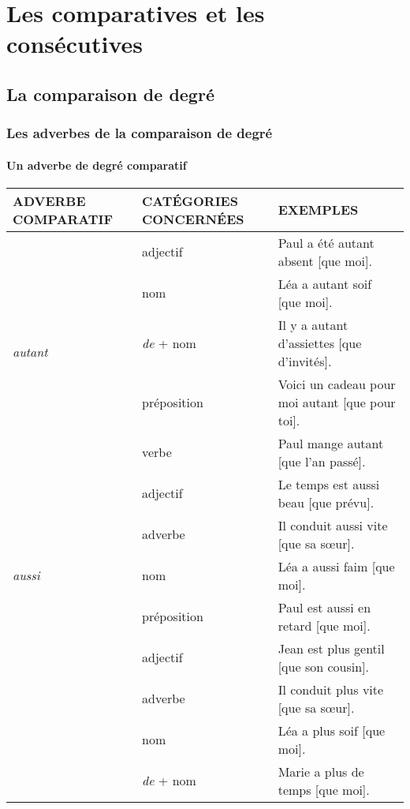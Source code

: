 \documentclass[UTF8]{report}
\begin{document}
\chapter{Les comparatives et les consécutives}
\section{La comparaison de degré}
\subsection{Les adverbes de la comparaison de degré}

\subsubsection{Un adverbe de degré comparatif}
\begin{table}[H]
\centering
\small
\begin{adjustbox}{max width=\textwidth}
    \begin{tabular}{|p{3cm}|p{3.5cm}|p{8.5cm}|}
    \hline
    \rowcolor{cyan!20}
    \textbf{ADVERBE COMPARATIF} & \textbf{CATÉGORIES CONCERNÉES} & \textbf{EXEMPLES} \\
    \hline
    \multirow{5}{*}{\textit{autant}} & adjectif & Paul a été autant absent [que moi]. \\
    & nom & Léa a autant soif [que moi]. \\
    & \textit{de} + nom & Il y a autant d'assiettes [que d'invités]. \\
    & préposition & Voici un cadeau pour moi autant [que pour toi]. \\
    & verbe & Paul mange autant [que l'an passé]. \\
    \hline
    \multirow{5}{*}{\textit{aussi}} & adjectif & Le temps est aussi beau [que prévu]. \\
    & adverbe & Il conduit aussi vite [que sa sœur]. \\
    & nom & Léa a aussi faim [que moi]. \\
    & préposition & Paul est aussi en retard [que moi]. \\
    \hline
    \multirow{6}{*}{\textit{davantage, plus}} & adjectif & Jean est plus gentil [que son cousin]. \\
    & adverbe & Il conduit plus vite [que sa sœur]. \\
    & nom & Léa a plus soif [que moi]. \\
    & \textit{de} + nom & Marie a plus de temps [que moi]. \\

\end{tabular}
\end{adjustbox}
\end{table}
\end{document}
